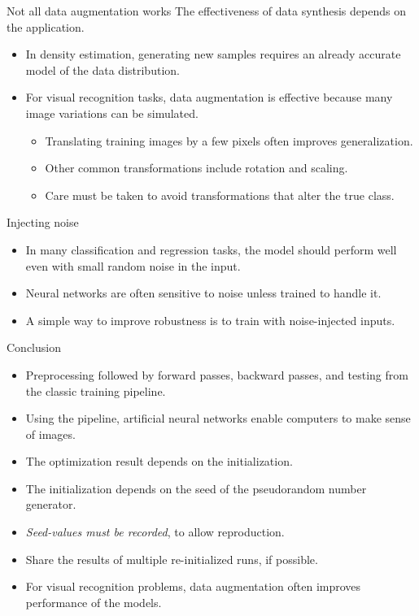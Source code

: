 \documentclass{beamer}
\begin{document}
\begin{frame}{Not all data augmentation works}
    The effectiveness of data synthesis depends on the application.	%
    \begin{itemize}
        \item In density estimation, generating new samples requires an already accurate model of the data distribution. %
        \item For visual recognition tasks, data augmentation is effective because many image variations can be simulated.	%
        \begin{itemize}
            \item Translating training images by a few pixels often improves generalization.	%
            \item Other common transformations include rotation and scaling.	%
            \item Care must be taken to avoid transformations that alter the true class.
        \end{itemize}
    \end{itemize}
\end{frame}

\begin{frame}{Injecting noise}
\begin{itemize}
    \item In many classification and regression tasks, the model should perform well even with small random noise in the input.  
    \item Neural networks are often sensitive to noise unless trained to handle it.  
    \item A simple way to improve robustness is to train with noise-injected inputs.  
\end{itemize}
\end{frame}

    \begin{frame}{Conclusion}
      \begin{itemize}
        \item Preprocessing followed by forward passes, backward passes, and testing from the classic training pipeline.
        \item Using the pipeline, artificial neural networks enable computers to make sense of images.
        \item The optimization result depends on the initialization.
        \item The initialization depends on the seed of the pseudorandom number generator.
        \item \textit{Seed-values must be recorded}, to allow reproduction.
        \item Share the results of multiple re-initialized runs, if possible.
				\item For visual recognition problems, data augmentation often improves performance of the models.
      \end{itemize}
    \end{frame}
\end{document}
